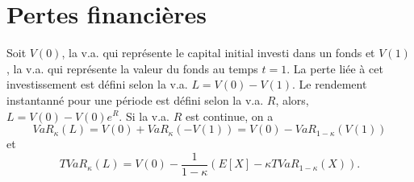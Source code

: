 \section{Pertes financières}

\begin{definition}{}{}
	Soit $V(0)$, la v.a. qui représente le capital initial investi dans un fonds et $V(1)$, la v.a. qui représente la valeur du fonds au temps $t = 1$. La perte liée à cet investissement est défini selon la v.a. $L = V(0) - V(1)$. Le rendement instantanné pour une période est défini selon la v.a. $R$, alors, $L = V(0) - V(0)e^R$. Si la v.a. $R$ est continue, on a 
	$$VaR_\kappa(L) = V(0) + VaR_\kappa(-V(1)) = V(0) - VaR_{1 - \kappa}(V(1))$$
	et
	$$TVaR_\kappa(L) = V(0) - \frac{1}{1 - \kappa} \left(E[X]-\kappa TVaR_{1 - \kappa}(X)\right).$$
\end{definition}